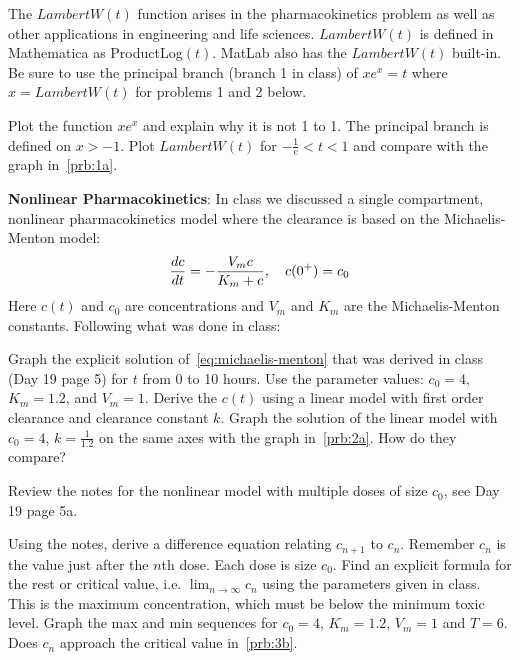 \documentclass[
    number={8},
]{math486homework}
\begin{document}
\maketitle

The $LambertW(t)$ function arises in the pharmacokinetics problem as well as other applications in engineering and life sciences.
$LambertW(t)$ is defined in Mathematica as ProductLog$(t)$.
MatLab also has the $LambertW(t)$ built-in.
Be sure to use the principal branch (branch 1 in class) of $xe^{x} = t$ where $x = LambertW(t)$ for problems 1 and 2 below.

\begin{problems}
    \problem
    \begin{problems}
        \subproblem Plot the function $xe^{x}$ and explain why it is not 1 to 1.
        The principal branch is defined on $x > -1$. 
        \subproblem Plot $LambertW(t)$ for $-\frac{1}{e} < t < 1$ and compare with the graph in~\ref{prb:1a}. 
    \end{problems}
    \problem \textbf{Nonlinear Pharmacokinetics}: In class we discussed a single compartment, nonlinear pharmacokinetics model where the clearance is based on the Michaelis-Menton model:
    \begin{equation}
    	\frac{dc}{dt} = -\frac{V_{m}c}{K_{m} + c},\ \ \ c(0^{+}) = c_{0}\\
    	\label{eq:michaelis-menton}
    \end{equation}
    Here $c(t)$ and $c_{0}$ are concentrations and $V_{m}$ and $K_{m}$ are the Michaelis-Menton constants.
    Following what was done in class:
    \begin{problems}
        \subproblem Graph the explicit solution of~\eqref{eq:michaelis-menton} that was derived in class (Day 19 page 5) for $t$ from 0 to 10 hours.
        Use the parameter values: $c_{0} = 4$, $K_{m} = 1.2$, and $V_{m} = 1$. 
        \subproblem Derive the $c(t)$ using a linear model with first order clearance and clearance constant $k$.
        \subproblem Graph the solution of the linear model with $c_{0} = 4$, $k = \frac{1}{1.2}$ on the same axes with the graph in~\ref{prb:2a}.
        How do they compare? 
    \end{problems}
    \problem Review the notes for the nonlinear model with multiple doses of size $c_{0}$, see Day 19 page 5a.
    \begin{problems}
        \subproblem Using the notes, derive a difference equation relating $c_{n+1}$ to $c_{n}$.
        Remember $c_{n}$ is the value just after the $n$th dose.
        Each dose is size $c_{0}$. 
        \subproblem Find an explicit formula for the rest or critical value, i.e. $\lim_{n\rightarrow \infty} c_{n}$ using the parameters given in class.
        This is the maximum concentration, which must be below the minimum toxic level. 
        \subproblem Graph the max and min sequences for $c_{0} = 4$, $K_{m} = 1.2$, $V_{m} = 1$ and $T = 6$.
        Does $c_{n}$ approach the critical value in~\ref{prb:3b}. 
    \end{problems}
\end{problems}
\end{document}
